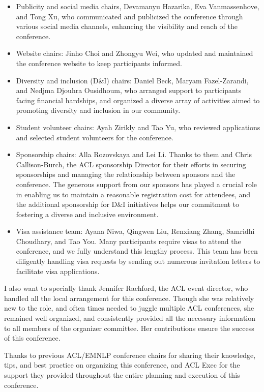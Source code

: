 \begin{itemize}
\item Publicity and social media chairs, Devamanyu Hazarika, Eva Vanmassenhove, and Tong Xu, who communicated and publicized the conference through various social media channels, enhancing the visibility and reach of the conference.
\item Website chairs: Jinho Choi and Zhongyu Wei, who updated and maintained the conference website to keep participants informed.
\item Diversity and inclusion (D\&I) chairs: Daniel Beck, Maryam Fazel-Zarandi, and Nedjma Djouhra Ousidhoum, who arranged support to participants facing financial hardships, and organized a diverse array of activities aimed to promoting diversity and inclusion in our community.
\item Student volunteer chairs: Ayah Zirikly and Tao Yu, who reviewed applications and selected student volunteers for the conference. 
\item Sponsorship chairs: Alla Rozovskaya and Lei Li. Thanks to them and Chris Callison-Burch, the ACL sponsorship Director for their efforts in securing sponsorships and managing the relationship between sponsors and the conference. The generous support from our sponsors has played a crucial role in enabling us to maintain a reasonable registration cost for attendees, and the additional sponsorship for D\&I initiatives helps our commitment to fostering a diverse and inclusive environment.
\item Visa assistance team: Ayana Niwa, Qingwen Liu, Renxiang Zhang, Samridhi Choudhary, and Tao You. Many participants require visas to attend the conference, and we fully understand this lengthy process. This team has been diligently handling visa requests by sending out numerous invitation letters to facilitate visa applications.
\end{itemize}
 
I also want to specially thank Jennifer Rachford, the ACL event director, who handled all the local arrangement for this conference. Though she was relatively new to the role, and often times needed to juggle multiple ACL conferences, she remained well organized, and consistently provided all the necessary information to all members of the organizer committee. Her contributions ensure the success of this conference.

Thanks to previous ACL/EMNLP conference chairs for sharing their knowledge, tips, and best practice on organizing this conference, and ACL Exec for the support they provided throughout the entire planning and execution of this conference. 

